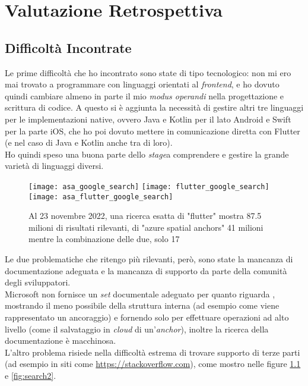 
\chapter{Valutazione Retrospettiva}
\label{cap:valutazione-retrospettiva}

\section{Difficoltà Incontrate}
\label{sec:difficolta_incontrate}
Le prime difficoltà che ho incontrato sono state di tipo tecnologico: non mi ero mai trovato a programmare con linguaggi orientati al \textit{frontend}, e ho dovuto quindi cambiare almeno in parte il mio \textit{modus operandi} nella progettazione e scrittura di codice. A questo si è aggiunta la necessità di gestire altri tre linguaggi per le implementazioni native, ovvero Java e Kotlin per il lato Android e Swift per la parte iOS, che ho poi dovuto mettere in comunicazione diretta con Flutter (e nel caso di Java e Kotlin anche tra di loro).\\ 
Ho quindi speso una buona parte dello \textit{stage}a comprendere e gestire la grande varietà di linguaggi diversi.

\begin{figure}[H]
  \centering
  \texttt{[image: asa\_google\_search]}\hfill
  \texttt{[image: flutter\_google\_search]}\\
  \texttt{[image: asa\_flutter\_google\_search]}
  \caption[Ricerca esatta Flutter e ASA 23 novembre]{Al 23 novembre 2022, una ricerca esatta di "flutter" mostra 87.5 milioni di risultati rilevanti, di "azure spatial anchors" 41 milioni mentre la combinazione delle due, solo 17}
\label{fig:search1}
\end{figure}

Le due problematiche che ritengo più rilevanti, però, sono state la mancanza di documentazione adeguata e la mancanza di supporto da parte della comunità degli sviluppatori.\\
Microsoft non fornisce un \textit{set} documentale adeguato per quanto riguarda \asa{}, mostrando il meno possibile della struttura interna (ad esempio come viene rappresentato un ancoraggio) e fornendo solo \api{} per effettuare operazioni ad alto livello (come il salvataggio in \textit{cloud} di un'\textit{anchor}), inoltre la ricerca della documentazione è macchinosa.\\
L'altro problema risiede nella difficoltà estrema di trovare supporto di terze parti (ad esempio in siti come \url{https://stackoverflow.com}), come mostro nelle figure \ref{fig:search1} e \ref{fig:search2}.

